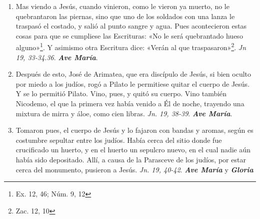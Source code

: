 \documentclass[../../devocionario.tex]{subfiles}
\begin{document}
\begin{enumerate}
        \item Mas viendo a Jesús, cuando vinieron, como le vieron ya muerto, no le quebrantaron las piernas, sino que uno de los soldados 
            con una lanza le traspasó el costado, y salió al punto sangre y agua. Pues acontecieron estas cosas para que se cumpliese las
            Escrituras: «No le será quebrantado hueso alguno»\footnote{Ex. 12, 46; Núm. 9, 12}. Y asimismo otra Escritura dice: «Verán al que
            traspasaron»\footnote{Zac. 12, 10}. \emph{Jn 19, 33-34.36}. \textbf{\emph{Ave María}}.

        \item Después de esto, José de Arimatea, que era discípulo de Jesús, si bien oculto por miedo a los judíos, rogó a Pilato le permitiese
            quitar el cuerpo de Jesús. Y se lo permitió Pilato. Vino, pues, y quitó su cuerpo. Vino también Nicodemo, el que la primera vez había
            venido a Él de noche, trayendo una mixtura de mirra y áloe, como cien libras.
            \emph{Jn. 19, 38-39}. \textbf{\emph{Ave María}}.            

        \item Tomaron pues, el cuerpo de Jesús y lo fajaron con bandas y aromas, según es costumbre sepultar entre los judíos. Había cerca
            del sitio donde fue crucificado un huerto, y en el huerto un sepulcro nuevo, en el cual nadie aún había sido depositado.
            Allí, a causa de la Parasceve de los judíos, por estar cerca del monumento, pusieron a Jesús. 
            \emph{Jn. 19, 40-42}. \textbf{\emph{Ave María}} y \textbf{\emph{Gloria}}

    \end{enumerate}
\end{document}
